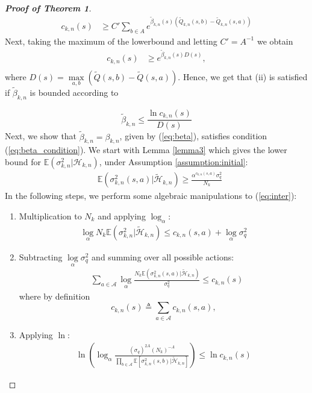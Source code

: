 \documentclass[lettersize,journal]{IEEEtran}
\begin{document}
\begin{appendices}
\begin{proof}[\textbf{Proof of Theorem 1}]
\begin{align}
    c_{k,n}(s) & \geq C' \sum_{b \in A} e^{\widetilde{\beta}_{k,n}(s) (\widetilde{Q}_{k,n}(s, b)-\widetilde{Q}_{k,n}(s, a))}
\end{align}
Next, taking the maximum of the lowerbound and letting $C'=A^{-1}$ we obtain 
\begin{align}
c_{k,n}(s) & \geq e^{\widetilde{\beta}_{k,n}(s)D(s)}, \nonumber \\
\end{align}
where $D(s)=\max\limits_{a,b}(\widetilde{Q}(s,b)-\widetilde{Q}(s,a))$. Hence, we get that (ii) is satisfied if  $\widetilde{\beta}_{k,n}$ is bounded according to 

\begin{equation}
\label{eq:beta_condition}
\widetilde{\beta}_{k,n} \leq \frac{\ln  c_{k,n}(s)}{D(s)} 
\end{equation}
Next, we show that $\widetilde{\beta}_{k,n}=\beta_{k,n}$, given by (\ref{eq:beta}), satisfies condition (\ref{eq:beta_condition}). We start with Lemma \ref{lemma3} which gives  the lower bound for $ \mathbb{E}(\sigma_{k,n}^2|\mathcal{H}_{k,n})$, under Assumption \ref{assumption:initial}:
\begin{align}
\label{eq:inter}
    & \mathbb{E}(\sigma_{k,n}^2(s,a)|\widetilde{\mathcal{H}}_{k,n})\geq\frac{\alpha^{c_{k,n}(s,a)}  \sigma_q^2}{N_k} 
\end{align}
In the following steps, we perform some algebraic manipulations to  (\ref{eq:inter}): 
\begin{enumerate} [label=\ Step \arabic*.,align=left, leftmargin=*]
    \item Multiplication to $N_k$ and applying $\log_{\alpha}$: 
    \begin{align}
        \log \limits_{\alpha}N_k \mathbb{E}(\sigma_{k,n}^2|\widetilde{\mathcal{H}}_{k,n})\leq c_{k,n}(s,a)+\log \limits_{\alpha}\sigma_q^2  
    \end{align}
    \item Subtracting $\log \limits_{\alpha}\sigma_q^2$ and summing over all possible actions:
\begin{align}
        &\sum\limits_{a\in\mathcal{A}}\log \limits_{\alpha}\frac{N_k \mathbb{E}(\sigma_{k,n}^2(s,a)|\widetilde{\mathcal{H}}_{k,n})}{\sigma_q^2}\leq c_{k,n}(s) 
\end{align}
where by definition
\begin{equation}
    c_{k,n}(s)\triangleq \sum \limits_{a\in \mathcal{A}}c_{k,n}(s,a), 
\end{equation}
\item Applying $\ln$:
\begin{align}
\label{eq:444}
   \ln \left(\log_{\alpha}\frac{(\sigma_q)^{2A}(N_k)^{-A}}{\prod \limits_{b\in \mathcal{A}} \mathbb{E} \left[\sigma_{k,n}^2(s,b)|\widetilde{\mathcal{H}}_{k,n}\right ]}\right)\leq \ln c_{k,n}(s)
\end{align}
\end{enumerate}



\end{proof}
\end{appendices}
\end{document}
